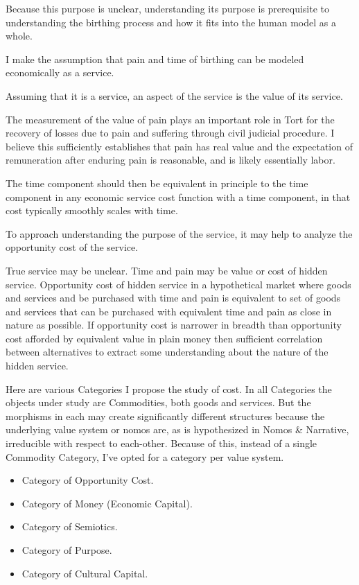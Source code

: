 \documentclass[11pt]{book}
\begin{document}
Because this purpose is unclear, understanding its purpose is prerequisite to understanding the birthing process and how it fits into the human model as a whole.

I make the assumption that pain and time of birthing can be modeled economically as a service.

Assuming that it is a service, an aspect of the service is the value of its service.

The measurement of the value of pain plays an important role in Tort for the recovery of losses due to pain and suffering through civil judicial procedure. I believe this sufficiently establishes that pain has real value and the expectation of remuneration after enduring pain is reasonable, and is likely essentially labor.

The time component should then be equivalent in principle to the time component in any economic service cost function with a time component, in that cost typically smoothly scales with time.

To approach understanding the purpose of the service, it may help to analyze the opportunity cost of the service.

True service may be unclear. Time and pain may be value or cost of hidden service. Opportunity cost of hidden service in a hypothetical market where goods and services and be purchased with time and pain is equivalent to set of goods and services that can be purchased with equivalent time and pain as close in nature as possible.
If opportunity cost is narrower in breadth than opportunity cost afforded by equivalent value in plain money then sufficient correlation between alternatives to extract some understanding about the nature of the hidden service.

Here are various Categories I propose the study of cost. In all Categories the objects under study are Commodities, both goods and services. But the morphisms in each may create significantly different structures because the underlying value system or nomos are, as is hypothesized in Nomos \& Narrative, irreducible with respect to each-other. Because of this, instead of a single Commodity Category, I've opted for a category per value system.

\begin{itemize}
	\item Category of Opportunity Cost.
	\item Category of Money (Economic Capital).
	\item Category of Semiotics.
	\item Category of Purpose.
	\item Category of Cultural Capital.
\end{itemize}
\end{document}
